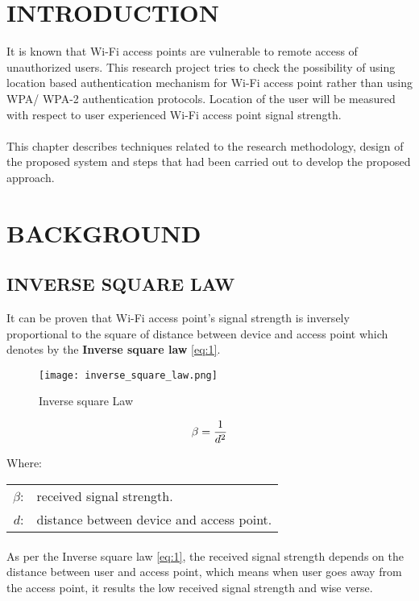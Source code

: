 \section{INTRODUCTION}
It is known that Wi-Fi access points are vulnerable to remote access of unauthorized users. This research project tries to check the possibility of using location based authentication mechanism for Wi-Fi access point rather than using WPA/ WPA-2 authentication protocols. Location of the user will be measured with respect to user experienced Wi-Fi access point signal strength.

\paragraph{}
This chapter describes techniques related to the research methodology, design of the proposed system and steps that had been carried out to develop the proposed approach. 

\section{BACKGROUND}
\subsection{INVERSE SQUARE LAW}
It can be proven that Wi-Fi access point's signal strength is inversely proportional to the square of distance between device and access point which denotes by the \textbf {Inverse square law} \ref{eq:1}.

\begin{figure}[h]	
	\centering
	\texttt{[image: inverse\_square\_law.png]}
	\caption{Inverse square Law}
\end{figure}

\begin{equation}\boldmath\label{eq:1}
	\beta=\frac{1}{d^2}
\end{equation}\newline


Where:\\
\hspace*{3em}
\begin{tabular}{rl}
	$\beta$:&   received signal strength. \\
	$d$:&  distance between device and access point. \\
\end{tabular}\newline

\paragraph{}
As per the Inverse square law \ref{eq:1}, the received signal strength depends on the distance between user and access point, which means when user goes away from the access point, it results the low received signal strength and wise verse.

